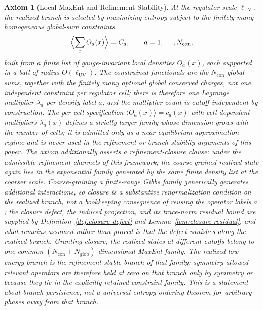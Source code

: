 \documentclass[11pt]{article}
\newtheorem{axiom}[theorem]{Axiom}
\begin{document}
\begin{axiom}[Local MaxEnt and Refinement Stability]\label{ax:maxent}
At the regulator scale \(\ell_{\mathrm{UV}}\), the realized branch is selected by maximizing entropy subject to the finitely many homogeneous global-sum constraints
\[
\Bigl\langle\sum_x O_a(x)\Bigr\rangle=C_a,
\qquad a=1,\dots,N_{\mathrm{con}},
\]
built from a finite list of gauge-invariant local densities \(O_a(x)\), each supported in a ball of radius \(O(\ell_{\mathrm{UV}})\). The constrained functionals are the \(N_{\mathrm{con}}\) global sums, together with the finitely many optional global conserved charges, not one independent constraint per regulator cell; there is therefore one Lagrange multiplier \(\lambda_a\) per density label \(a\), and the multiplier count is cutoff-independent by construction. The per-cell specification \(\langle O_a(x)\rangle=c_a(x)\) with cell-dependent multipliers \(\lambda_a(x)\) defines a strictly larger family whose dimension grows with the number of cells; it is admitted only as a near-equilibrium approximation regime and is never used in the refinement or branch-stability arguments of this paper. The axiom additionally asserts a \emph{refinement-closure clause}: under the admissible refinement channels of this framework, the coarse-grained realized state again lies in the exponential family generated by the same finite density list at the coarser scale. Coarse-graining a finite-range Gibbs family generically generates additional interactions, so closure is a substantive renormalization condition on the realized branch, not a bookkeeping consequence of reusing the operator labels \(a\); the closure defect, the induced projection, and its trace-norm residual bound are supplied by Definition~\ref{def:closure-defect} and Lemma~\ref{lem:closure-residual}, and what remains assumed rather than proved is that the defect vanishes along the realized branch. Granting closure, the realized states at different cutoffs belong to one common \((N_{\mathrm{con}}+N_{\mathrm{glob}})\)-dimensional MaxEnt family. The realized low-energy branch is the refinement-stable branch of that family; symmetry-allowed relevant operators are therefore held at zero on that branch only by symmetry or because they lie in the explicitly retained constraint family. This is a statement about branch persistence, not a universal entropy-ordering theorem for arbitrary phases away from that branch.
\end{axiom}
\end{document}
